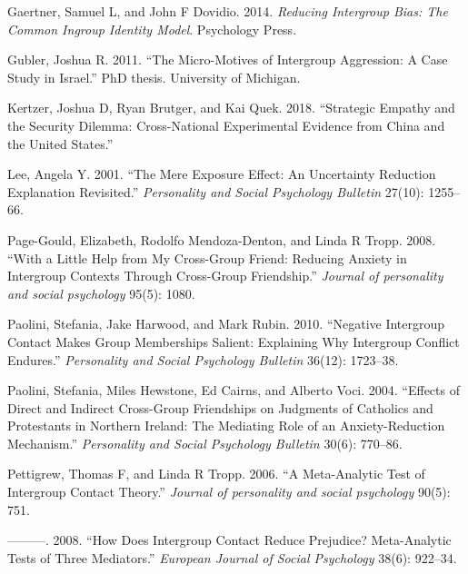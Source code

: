 \documentclass[11pt]{article}
\begin{document}
\leavevmode\hypertarget{ref-gaertner2014reducing}{}%
Gaertner, Samuel L, and John F Dovidio. 2014. \emph{Reducing Intergroup
Bias: The Common Ingroup Identity Model}. Psychology Press.

\leavevmode\hypertarget{ref-gubler2011diss}{}%
Gubler, Joshua R. 2011. ``The Micro-Motives of Intergroup Aggression: A
Case Study in Israel.'' PhD thesis. University of Michigan.

\leavevmode\hypertarget{ref-kertzer2018empathy}{}%
Kertzer, Joshua D, Ryan Brutger, and Kai Quek. 2018. ``Strategic Empathy
and the Security Dilemma: Cross-National Experimental Evidence from
China and the United States.''

\leavevmode\hypertarget{ref-lee2001mere}{}%
Lee, Angela Y. 2001. ``The Mere Exposure Effect: An Uncertainty
Reduction Explanation Revisited.'' \emph{Personality and Social
Psychology Bulletin} 27(10): 1255--66.

\leavevmode\hypertarget{ref-page2008little}{}%
Page-Gould, Elizabeth, Rodolfo Mendoza-Denton, and Linda R Tropp. 2008.
``With a Little Help from My Cross-Group Friend: Reducing Anxiety in
Intergroup Contexts Through Cross-Group Friendship.'' \emph{Journal of
personality and social psychology} 95(5): 1080.

\leavevmode\hypertarget{ref-paolini2010negative}{}%
Paolini, Stefania, Jake Harwood, and Mark Rubin. 2010. ``Negative
Intergroup Contact Makes Group Memberships Salient: Explaining Why
Intergroup Conflict Endures.'' \emph{Personality and Social Psychology
Bulletin} 36(12): 1723--38.

\leavevmode\hypertarget{ref-paolini2004effects}{}%
Paolini, Stefania, Miles Hewstone, Ed Cairns, and Alberto Voci. 2004.
``Effects of Direct and Indirect Cross-Group Friendships on Judgments of
Catholics and Protestants in Northern Ireland: The Mediating Role of an
Anxiety-Reduction Mechanism.'' \emph{Personality and Social Psychology
Bulletin} 30(6): 770--86.

\leavevmode\hypertarget{ref-pettigrew2006meta}{}%
Pettigrew, Thomas F, and Linda R Tropp. 2006. ``A Meta-Analytic Test of
Intergroup Contact Theory.'' \emph{Journal of personality and social
psychology} 90(5): 751.

\leavevmode\hypertarget{ref-pettigrew2008does}{}%
---------. 2008. ``How Does Intergroup Contact Reduce Prejudice?
Meta-Analytic Tests of Three Mediators.'' \emph{European Journal of
Social Psychology} 38(6): 922--34.
\end{document}

